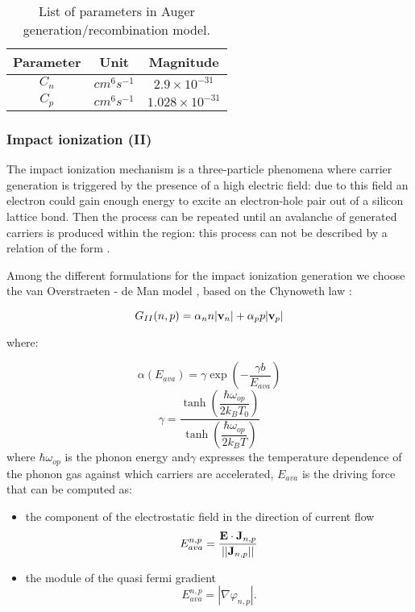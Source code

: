 \begin{table}[!h]
\centering
\begin{tabular}{ccc}
\toprule
Parameter & Unit & Magnitude \\
\midrule
$C_n$ & $cm^6s^{-1}$ & $2.9 \times 10^{-31}$ \\
$C_p$ & $cm^6s^{-1}$ & $1.028 \times 10^{-31}$ \\
\bottomrule
\end{tabular}
\caption{List of parameters in Auger generation/recombination model.}
\end{table}

\subsubsection{Impact ionization (II)}
\label{sec: ImpactIonization}

The impact ionization mechanism is a three-particle phenomena where carrier generation is triggered by the presence of a high electric field: due to this field an electron could gain enough energy to excite an electron-hole pair out of a silicon lattice bond. Then the process can be repeated until an avalanche of generated carriers is produced within the region: this process can not be described  by a relation of the form . 

Among the different formulations for the impact ionization generation we choose the van Overstraeten - de Man model \cite{VanOverII}, based on the Chynoweth law \cite{Cynoweth}:

\begin{equation}
G_{II}(n,p)= \alpha_n n |\mathbf{v}_n| + \alpha_p p |\mathbf{v}_p|
\end{equation}

where:

\begin{equation}
\alpha(E_{ava}) = \gamma \exp\left(-\dfrac{\gamma b}{E_{ava}} \right)
\end{equation} 
\begin{equation}
\gamma = \dfrac{\tanh\left(\dfrac{\hbar \omega_{op}}{2k_BT_0} \right) }{\tanh\left(\dfrac{\hbar \omega_{op}}{2k_BT} \right)}
\end{equation}
where $\hbar \omega_{op}$ is the phonon energy and$\gamma$ expresses the temperature dependence of the phonon gas against which carriers are accelerated, $E_{ava}$ is the driving force that can be computed as:
\begin{itemize}
\item the component of the electrostatic field in the direction of current flow
\begin{equation}
E_{ava}^{n,p} = \dfrac{\mathbf{E}\cdot\mathbf{J}_{n,p}}{||\mathbf{J}_{n,p}||}
\end{equation}
\item the module of the quasi fermi gradient
\begin{equation}
E_{ava}^{n,p} = |\nabla \varphi_{n,p}|.
\end{equation}
\end{itemize}


